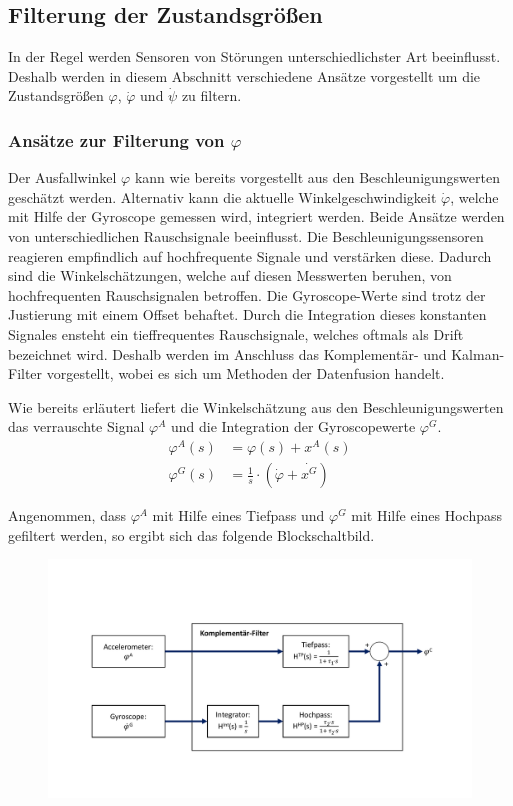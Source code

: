 \subsection{Filterung der Zustandsgrößen}
In der Regel werden Sensoren von Störungen unterschiedlichster Art beeinflusst. Deshalb werden in diesem Abschnitt verschiedene Ansätze vorgestellt um die Zustandsgrößen $\varphi$, $\dot{\varphi}$ und $\dot{\psi}$ zu filtern. 

\subsubsection{Ansätze zur Filterung von $\varphi$}
Der Ausfallwinkel $\varphi$ kann wie bereits vorgestellt aus den Beschleunigungswerten geschätzt werden. Alternativ kann die aktuelle Winkelgeschwindigkeit $\dot{\varphi}$, welche mit Hilfe der Gyroscope gemessen wird, integriert werden. Beide Ansätze werden von unterschiedlichen Rauschsignale beeinflusst. Die Beschleunigungssensoren reagieren empfindlich auf hochfrequente Signale und verstärken diese. Dadurch sind die Winkelschätzungen, welche auf diesen Messwerten beruhen, von hochfrequenten Rauschsignalen betroffen. 
Die Gyroscope-Werte sind trotz der Justierung mit einem Offset behaftet. Durch die Integration dieses konstanten Signales ensteht ein tieffrequentes Rauschsignale, welches oftmals als Drift bezeichnet wird. 
Deshalb werden im Anschluss das Komplementär- und Kalman-Filter vorgestellt, wobei es sich um Methoden der Datenfusion handelt.

Wie bereits erläutert liefert die Winkelschätzung aus den Beschleunigungswerten das verrauschte Signal $\varphi^A$ und die Integration der Gyroscopewerte $\varphi^G$.
\begin{equation}
\begin{split}
\varphi^A(s) &= \varphi(s) + x^A(s) \\
\varphi^G(s) &= \frac{1}{s} \cdot (\dot{\varphi} + \dot{x^G}) 
\end{split}
\end{equation}

Angenommen, dass $\varphi^A$ mit Hilfe eines Tiefpass und $\varphi^G$ mit Hilfe eines Hochpass gefiltert werden, so ergibt sich das folgende Blockschaltbild.

\begin{figure}[!h]
\includegraphics[scale=0.5,trim={0 3cm 0 4cm},clip]{img/Komp_CuBa_1D}
\end{figure}

